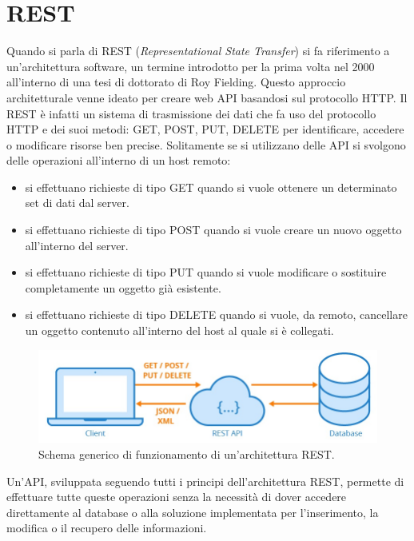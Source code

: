 \section{REST}
Quando si parla di REST (\textit{Representational State Transfer}) si fa riferimento a un'architettura software, un termine introdotto per 
la prima volta nel 2000 all'interno di una tesi di dottorato di Roy Fielding. Questo approccio architetturale venne ideato per creare 
web API basandosi sul protocollo HTTP. Il REST è infatti un sistema di trasmissione dei dati che fa uso del protocollo HTTP e dei suoi metodi: 
GET, POST, PUT, DELETE per identificare, accedere o modificare risorse ben precise.\hfill\break
Solitamente se si utilizzano delle API si svolgono delle operazioni all’interno di un host remoto:
\begin{itemize}
    \item si effettuano richieste di tipo GET quando si vuole ottenere un determinato set di dati dal server.
    \item si effettuano richieste di tipo POST quando si vuole creare un nuovo oggetto all’interno del server.
    \item si effettuano richieste di tipo PUT quando si vuole modificare o sostituire completamente un oggetto già esistente.
    \item si effettuano richieste di tipo DELETE quando si vuole, da remoto, cancellare un oggetto contenuto all’interno del 
    host al quale si è collegati.
\end{itemize}
%
\begin{figure}[ht!]
    \centering
    \includegraphics[scale=0.6]{images/api_rest.jpg}
    \caption[Schema di funzionamento di una architettura REST]{Schema generico di funzionamento di un'architettura REST.}
    \label{fig:rest_api}
\end{figure}
Un'API, sviluppata seguendo tutti i principi dell'architettura REST, permette di effettuare tutte queste operazioni senza la necessità 
di dover accedere direttamente al database o alla soluzione implementata per l'inserimento, la modifica o il recupero delle informazioni.
%

